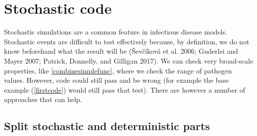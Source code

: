 \documentclass[
]{article}
\newenvironment{Shaded}{\begin{snugshade}}{\end{snugshade}}
\newcommand{\CommentTok}[1]{\textcolor[rgb]{0.56,0.35,0.01}{\textit{#1}}}
\newcommand{\ControlFlowTok}[1]{\textcolor[rgb]{0.13,0.29,0.53}{\textbf{#1}}}
\newcommand{\DataTypeTok}[1]{\textcolor[rgb]{0.13,0.29,0.53}{#1}}
\newcommand{\DecValTok}[1]{\textcolor[rgb]{0.00,0.00,0.81}{#1}}
\newcommand{\KeywordTok}[1]{\textcolor[rgb]{0.13,0.29,0.53}{\textbf{#1}}}
\newcommand{\NormalTok}[1]{#1}
\newcommand{\OperatorTok}[1]{\textcolor[rgb]{0.81,0.36,0.00}{\textbf{#1}}}
\newcommand{\StringTok}[1]{\textcolor[rgb]{0.31,0.60,0.02}{#1}}
\begin{document}
\begin{Shaded}
\end{Shaded}

\hypertarget{stochastic-code}{%
\section{Stochastic code}\label{stochastic-code}}

Stochastic simulations are a common feature in infectious disease models.
Stochastic events are difficult to test effectively because, by definition, we do not know beforehand what the result will be (Ševčíková et al. 2006; Guderlei and Mayer 2007; Patrick, Donnelly, and Gilligan 2017).
We can check very broad-scale properties, like \ref{combinesimplefunc}, where we check the range of pathogen values.
However, code could still pass and be wrong (for example the base example (\ref{firstcode}) would still pass that test).
There are however a number of approaches that can help.

\hypertarget{splitstochastic}{%
\subsection*{Split stochastic and deterministic parts}\label{splitstochastic}}
\end{document}
